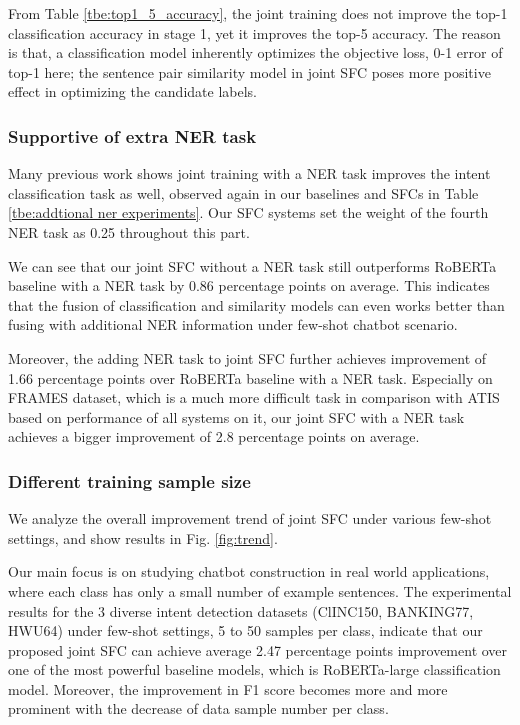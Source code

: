 From Table \ref{tbe:top1_5_accuracy}, the joint training does not improve the top-1 classification accuracy in stage 1, yet it improves the top-5 accuracy.
The reason is that, a classification model inherently optimizes the objective loss, 0-1 error of top-1 here; the sentence pair similarity model in joint SFC poses more positive effect in optimizing the candidate labels.

\subsubsection*{Supportive of extra NER task}
Many previous work shows joint training with a NER task improves the intent classification task as well, observed again in our baselines and SFCs in Table \ref{tbe:addtional ner experiments}.
Our SFC systems set the weight of the fourth NER task as 0.25 throughout this part. 

We can see that our joint SFC without a NER task still outperforms RoBERTa baseline with a NER task by 0.86 percentage points on average. 
This indicates that the fusion of classification and similarity models can even works better than fusing with additional NER information under few-shot chatbot scenario. 

Moreover, the adding NER task to joint SFC further achieves improvement of 1.66 percentage points over RoBERTa baseline with a NER task. 
Especially on FRAMES dataset, which is a much more difficult task in comparison with ATIS based on performance of all systems on it, our joint SFC with a NER task achieves a bigger improvement of 2.8 percentage points on average. 

\subsubsection*{Different training sample size} 
We analyze the overall improvement trend of joint SFC under various few-shot settings, and show results in Fig. \ref{fig:trend}.

Our main focus is on studying chatbot construction in real world applications, where each class has only a small number of example sentences.
The experimental results for the 3 diverse intent detection datasets (ClINC150, BANKING77, HWU64) under few-shot settings, 5 to 50 samples per class, indicate that our proposed joint SFC can achieve average 2.47 percentage points improvement over one of the most powerful baseline models, which is RoBERTa-large classification model. 
Moreover, the improvement in F1 score becomes more and more prominent with the decrease of data sample number per class.

